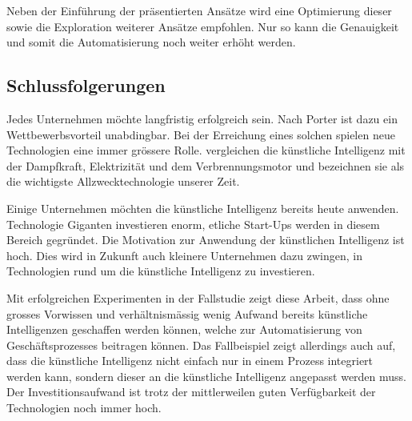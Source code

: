 Neben der Einführung der präsentierten Ansätze wird eine Optimierung dieser sowie die Exploration weiterer Ansätze empfohlen. Nur so kann die Genauigkeit und somit die Automatisierung noch weiter erhöht werden.


\subsection{Schlussfolgerungen}


Jedes Unternehmen möchte langfristig erfolgreich sein. Nach Porter ist dazu ein Wettbewerbsvorteil unabdingbar. Bei der Erreichung eines solchen spielen neue Technologien eine immer grössere Rolle. \textcite{McAfee} vergleichen die künstliche Intelligenz mit der Dampfkraft, Elektrizität und dem Verbrennungsmotor und bezeichnen sie als die wichtigste Allzwecktechnologie unserer Zeit.

Einige Unternehmen möchten die künstliche Intelligenz bereits heute anwenden. Technologie Giganten investieren enorm, etliche Start-Ups werden in diesem Bereich gegründet. Die Motivation zur Anwendung der künstlichen Intelligenz ist hoch. Dies wird in Zukunft auch kleinere Unternehmen dazu zwingen, in Technologien rund um die künstliche Intelligenz zu investieren.

Mit erfolgreichen Experimenten in der Fallstudie zeigt diese Arbeit, dass ohne grosses Vorwissen und verhältnismässig wenig Aufwand bereits künstliche Intelligenzen geschaffen werden können, welche zur Automatisierung von Geschäftsprozesses beitragen können. Das Fallbeispiel zeigt allerdings auch auf, dass die künstliche Intelligenz nicht einfach nur in einem Prozess integriert werden kann, sondern dieser an die künstliche Intelligenz angepasst werden muss. Der Investitionsaufwand ist trotz der mittlerweilen guten Verfügbarkeit der Technologien noch immer hoch.

